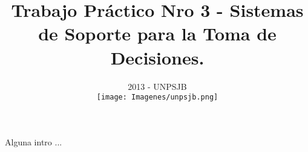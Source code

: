 \documentclass{article}
\begin{document}
\begin{large}
\title{\bf {Trabajo Práctico Nro 3 - Sistemas de Soporte para la Toma de Decisiones.}}
\end{large}
\date{2013 - UNPSJB\\[1cm]\texttt{[image: Imagenes/unpsjb.png]}}

\maketitle
\newpage

Alguna intro ...
\end{document}
